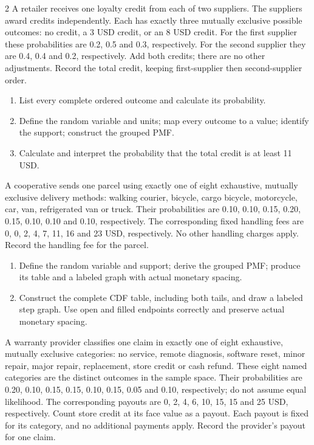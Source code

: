 \begin{multicols*}{2}
\columnbreak
{}
A retailer receives one loyalty credit from each of two suppliers. The suppliers award credits independently. Each has exactly three mutually exclusive possible outcomes: no credit, a 3 USD credit, or an 8 USD credit. For the first supplier these probabilities are 0.2, 0.5 and 0.3, respectively. For the second supplier they are 0.4, 0.4 and 0.2, respectively. Add both credits; there are no other adjustments. Record the total credit, keeping first-supplier then second-supplier order.

\begin{enumerate}[label=(\alph*)]
\item List every complete ordered outcome and calculate its probability. 
\item Define the random variable and units; map every outcome to a value; identify the support; construct the grouped PMF. 
\item Calculate and interpret the probability that the total credit is at least 11 USD. 
\end{enumerate}

A cooperative sends one parcel using exactly one of eight exhaustive, mutually exclusive delivery methods: walking courier, bicycle, cargo bicycle, motorcycle, car, van, refrigerated van or truck. Their probabilities are 0.10, 0.10, 0.15, 0.20, 0.15, 0.10, 0.10 and 0.10, respectively. The corresponding fixed handling fees are 0, 0, 2, 4, 7, 11, 16 and 23 USD, respectively. No other handling charges apply. Record the handling fee for the parcel.

\begin{enumerate}[label=(\alph*)]
\item Define the random variable and support; derive the grouped PMF; produce its table and a labeled graph with actual monetary spacing. 
\item Construct the complete CDF table, including both tails, and draw a labeled step graph. Use open and filled endpoints correctly and preserve actual monetary spacing. 
\end{enumerate}

\columnbreak
{}
A warranty provider classifies one claim in exactly one of eight exhaustive, mutually exclusive categories: no service, remote diagnosis, software reset, minor repair, major repair, replacement, store credit or cash refund. These eight named categories are the distinct outcomes in the sample space. Their probabilities are 0.20, 0.10, 0.15, 0.15, 0.10, 0.15, 0.05 and 0.10, respectively; do not assume equal likelihood. The corresponding payouts are 0, 2, 4, 6, 10, 15, 15 and 25 USD, respectively. Count store credit at its face value as a payout. Each payout is fixed for its category, and no additional payments apply. Record the provider's payout for one claim.


\end{multicols*}
